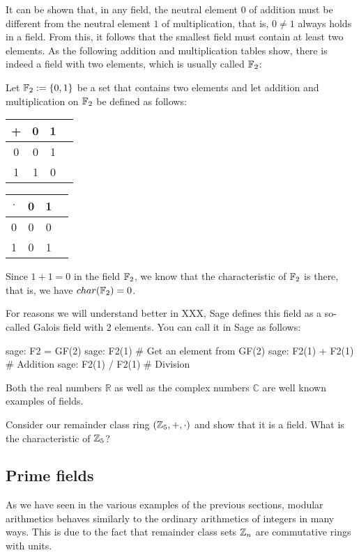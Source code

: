 \begin{example}\label{ex:field-2-elements} It can be shown that, in any field, the neutral element $0$ of addition must be different from the neutral element $1$ of multiplication, that is, $0\neq 1$ always holds in a field. From this, it follows that the smallest field must contain at least two elements. As the following addition and multiplication tables show, there is indeed a field with two elements, which is usually called $\mathbb{F}_2$:

Let $\mathbb{F}_2:=\{0,1 \}$ be a set that contains two elements and let addition and multiplication on $\mathbb{F}_2$ be defined as follows:
\begin{center}
  \begin{tabular}{c | c c c}
    + & 0 & 1 \\\hline
    0 & 0 & 1\\
    1 & 1 & 0 \\
  \end{tabular} \quad \quad \quad \quad
  \begin{tabular}{c | c c c}
$\cdot$ & 0 & 1 \\\hline
      0 & 0 & 0 \\
      1 & 0 & 1 \\
  \end{tabular}
\end{center}
Since $1+1=0$ in the field $\mathbb{F}_2$, we know that the characteristic of $\mathbb{F}_2$ is there, that is, we have $char(\mathbb{F}_2)=0$.

For reasons we will understand better in XXX, Sage defines this field as a so-called Galois field with 2 elements. You can call it in Sage as follows:
\begin{sagecommandline}
sage: F2 = GF(2)
sage: F2(1) # Get an element from GF(2)
sage: F2(1) + F2(1) # Addition
sage: F2(1) / F2(1) # Division
\end{sagecommandline}
\end{example}
\begin{example}
Both the real numbers $\mathbb{R}$ as well as the complex numbers $\mathbb{C}$ are well known examples of fields.
\end{example}
\begin{exercise}
Consider our remainder class ring $(\mathbb{Z}_5,+,\cdot)$ and show that it is a field. What is the characteristic of $\mathbb{Z}_5$?
\end{exercise}

\subsection{Prime fields}
\label{prime_fields}
As we have seen in the various examples of the previous sections, modular arithmetics behaves similarly to the ordinary arithmetics of integers  in many ways. This is due to the fact that remainder class sets $\mathbb{Z}_n$ are commutative rings with units.


